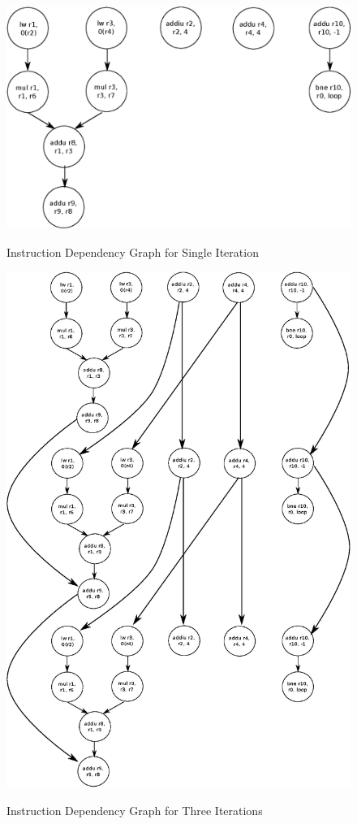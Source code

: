 \documentclass[10pt]{article}
\begin{document}
\begin{figure}[H]
\begin{center}
\includegraphics[scale=0.5]{singleiteri.eps}
\label{default}
\end{center}
\caption{Instruction Dependency Graph for Single Iteration}
\end{figure}

\begin{figure}[H]
\begin{center}
\includegraphics[scale=0.7]{threeiteri.eps}
\label{default}
\end{center}
\caption{Instruction Dependency Graph for Three Iterations}
\end{figure}
\end{document}
